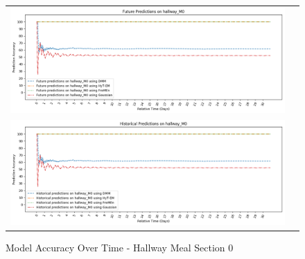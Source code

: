 \begin{figure}[!Hp]
  \begin{tabular}{cc}
    {\includegraphics[width = 6in]{images/results/Future_Predictions_on_hallway_M0.png}} \\
    {\includegraphics[width = 6in]{images/results/Historical_Predictions_on_hallway_M0.png}} \\
  \end{tabular}
  \caption{Model Accuracy Over Time - Hallway Meal Section 0}
\end{figure}



